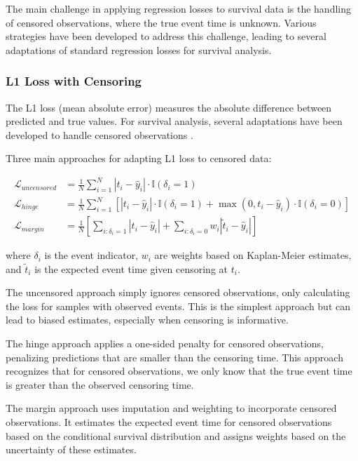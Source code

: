 The main challenge in applying regression losses to survival data is the handling of censored observations, where the true event time is unknown. Various strategies have been developed to address this challenge, leading to several adaptations of standard regression losses for survival analysis.

\subsubsection{L1 Loss with Censoring}

The L1 loss (mean absolute error) measures the absolute difference between predicted and true values. For survival analysis, several adaptations have been developed to handle censored observations \parencite{zhong2020,gensheimer2019}.

\begin{definitionbox}[title=L1 Loss Variants for Survival]
  Three main approaches for adapting L1 loss to censored data:

  \begin{align}
    \mathcal{L}_{uncensored} &= \frac{1}{N} \sum_{i=1}^N |t_i - \hat{y}_i| \cdot \mathbb{I}(\delta_i = 1) \\
    \mathcal{L}_{hinge} &= \frac{1}{N} \sum_{i=1}^N \left[ |t_i - \hat{y}_i| \cdot \mathbb{I}(\delta_i = 1) + \max(0, t_i - \hat{y}_i) \cdot \mathbb{I}(\delta_i = 0) \right] \\
    \mathcal{L}_{margin} &= \frac{1}{N} \left[ \sum_{i:\delta_i = 1} |t_i - \hat{y}_i| + \sum_{i:\delta_i = 0} w_i |\tilde{t}_i - \hat{y}_i| \right]
  \end{align}

  where $\delta_i$ is the event indicator, $w_i$ are weights based on Kaplan-Meier estimates, and $\tilde{t}_i$ is the expected event time given censoring at $t_i$.
\end{definitionbox}

The uncensored approach simply ignores censored observations, only calculating the loss for samples with observed events. This is the simplest approach but can lead to biased estimates, especially when censoring is informative.

The hinge approach applies a one-sided penalty for censored observations, penalizing predictions that are smaller than the censoring time. This approach recognizes that for censored observations, we only know that the true event time is greater than the observed censoring time.

The margin approach uses imputation and weighting to incorporate censored observations. It estimates the expected event time for censored observations based on the conditional survival distribution and assigns weights based on the uncertainty of these estimates.

